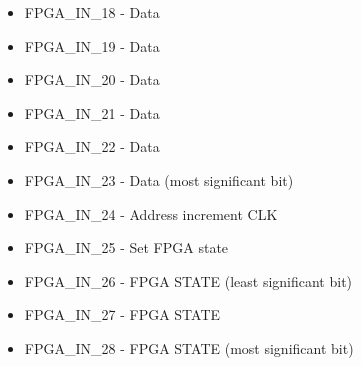 \begin{itemize}
\item FPGA\_IN\_18 - Data
\item FPGA\_IN\_19 - Data
\item FPGA\_IN\_20 - Data
\item FPGA\_IN\_21 - Data
\item FPGA\_IN\_22 - Data
\item FPGA\_IN\_23 - Data (most significant bit)
\item FPGA\_IN\_24 - Address increment CLK
\item FPGA\_IN\_25 - Set FPGA state
\item FPGA\_IN\_26 - FPGA STATE (least significant bit)
\item FPGA\_IN\_27 - FPGA STATE
\item FPGA\_IN\_28 - FPGA STATE (most significant bit)
\end{itemize}
